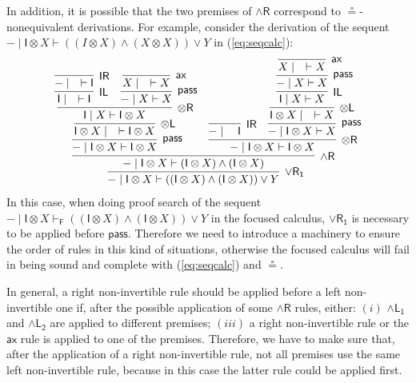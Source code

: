 \documentclass[submission,copyright,creativecommons]{eptcs}
\theoremstyle{definition}
\newcommand{\tl}{\otimes \mathsf{L}}
\newcommand{\tr}{\otimes \mathsf{R}}
\newcommand{\pass}{\mathsf{pass}}
\newcommand{\unitl}{\mathsf{IL}}
\newcommand{\unitr}{\mathsf{IR}}
\newcommand{\andlone}{\land \mathsf{L_{1}}}
\newcommand{\andltwo}{\land \mathsf{L_{2}}}
\newcommand{\andr}{\land \mathsf{R}}
\newcommand{\orrone}{\lor \mathsf{R_{1}}}
\newcommand{\ax}{\mathsf{ax}}
\newcommand{\ot}{\otimes}
\newcommand{\I}{\mathsf{I}}
\newcommand{\Pass}{\mathsf{P}}
\newcommand{\F}{\mathsf{F}}
\newcommand{\tP}{\mathbb{P}}
\newcommand\niccolo[1]{\mbox{}
{\marginpar{\color{red}NV}}
{\sf\noindent\color{red}#1}}%
\begin{document}
In addition, it is possible that the two premises of $\andr$ correspond to $\circeq$-nonequivalent derivations.
For example, consider the derivation of the sequent $- \mid \I \ot X \vdash ((I \ot X) \land (X \ot X)) \lor Y$ in (\ref{eq:seqcalc}): 
\begin{equation}
  \begin{array}{c}
    \infer[\orrone]{- \mid \I \ot X \vdash ((\I \ot X) \land (\I \ot X)) \lor Y}{
      \infer[\andr]{- \mid \I \ot X \vdash (\I \ot X) \land (\I \ot X)}{
        \infer[\pass]{- \mid \I \ot X \vdash \I \ot X}{
          \infer[\tl]{\I \ot X \mid \quad \vdash \I \ot X}{
            \infer[\tr]{\I \mid X \vdash \I \ot X}{
              \infer[\unitl]{\I \mid \quad \vdash \I}{
                \infer[\unitr]{- \mid \quad \vdash \I}{}
              }
              &
              \infer[\pass]{- \mid X \vdash X}{
                \infer[\ax]{X \mid \quad \vdash X}{}
              }
            }
          }
        }
        &
        \infer[\tr]{- \mid \I \ot X \vdash \I \ot X}{
          \infer[\unitr]{- \mid \quad \I}{}
          &
          \infer[\pass]{- \mid \I \ot X \vdash X}{
            \infer[\tl]{\I \ot X \mid \quad \vdash X}{
              \infer[\unitl]{\I \mid X \vdash X}{
                \infer[\pass]{- \mid X \vdash X}{
                  \infer[\ax]{X \mid \quad \vdash X}{}
                }
              }
            }
          }
        }
      }
    }
  \end{array}
\end{equation}
In this case, when doing proof search of the sequent $- \mid \I \ot X \vdash_{\F} ((\I \ot X) \land (\I \ot X)) \lor Y$ in the focused calculus, $\orrone$ is necessary to be applied before $\pass$.
Therefore we need to introduce a machinery to ensure the order of rules in this kind of situations, otherwise the focused calculus will fail in being sound and complete with (\ref{eq:seqcalc}) and $\circeq$. 

In general, a right non-invertible rule should be applied  before a left non-invertible one if, after the possible application of some $\andr$ rules, either:
$(i)$ $\andlone$ and $\andltwo$ are applied to different premises;
$(iii)$ a right non-invertible rule or the $\ax$ rule is applied to one of the premises.
Therefore, we have to make sure that, after the application of a right non-invertible rule, not all premises use the same left non-invertible rule, because in this case the latter rule could be applied first.
\end{document}
